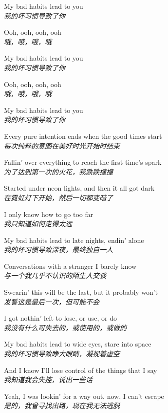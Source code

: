 \begin{spacing}{1.5}
\begin{flushleft}
My bad habits lead to you\\
\textit{我的坏习惯导致了你}\lyricspace

Ooh, ooh, ooh, ooh\\
\textit{哦，哦，哦，哦}\lyricspace

My bad habits lead to you\\
\textit{我的坏习惯导致了你}\lyricspace

Ooh, ooh, ooh, ooh\\
\textit{哦，哦，哦，哦}\lyricspace

My bad habits lead to you\\
\textit{我的坏习惯导致了你}\lyricspace

Every pure intention ends when the good times start\\
\textit{每次纯粹的意图在美好时光开始时结束}\lyricspace

Fallin' over everything to reach the first time's spark\\
\textit{为了达到第一次的火花，我跌跌撞撞}\lyricspace

Started under neon lights, and then it all got dark\\
\textit{在霓虹灯下开始，然后一切都变暗了}\lyricspace

I only know how to go too far\\
\textit{我只知道如何走得太远}\lyricspace

My bad habits lead to late nights, endin' alone\\
\textit{我的坏习惯导致深夜，最终独自一人}\lyricspace

Conversations with a stranger I barely know\\
\textit{与一个我几乎不认识的陌生人交谈}\lyricspace

Swearin' this will be the last, but it probably won't\\
\textit{发誓这是最后一次，但可能不会}\lyricspace

I got nothin' left to lose, or use, or do\\
\textit{我没有什么可失去的，或使用的，或做的}\lyricspace

My bad habits lead to wide eyes, stare into space\\
\textit{我的坏习惯导致睁大眼睛，凝视着虚空}\lyricspace

And I know I'll lose control of the things that I say\\
\textit{我知道我会失控，说出一些话}\lyricspace

Yeah, I was lookin' for a way out, now, I can't escape\\
\textit{是的，我曾寻找出路，现在我无法逃脱}\lyricspace


\end{flushleft}
\end{spacing}
